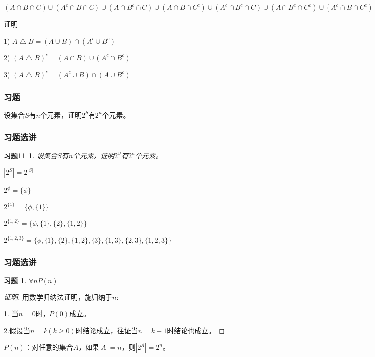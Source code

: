 \documentclass{beamer}
\begin{document}
\begin{CJK*}{UTF8}{gbsn}
\begin{frame}
\begin{Exercise}
$(A \cap B \cap C)\cup (A^c \cap B \cap C) \cup (A \cap B^c \cap C) \cup (A \cap B \cap C^c) \cup (A^c \cap B^c \cap C) \cup (A \cap B^c \cap C^c) \cup (A^c \cap B \cap C^c)$
  \end{Exercise}
  \begin{Exercise}
   证明

1) $A\bigtriangleup B = (A\cup B) \cap (A^c \cup B^c)$

2) $(A \bigtriangleup B)^c = (A \cap B) \cup (A^c \cap B^c)$

3) $(A \bigtriangleup B)^c = (A^c \cup B) \cap (A \cup B^c)$
  \end{Exercise}  
\end{frame}

\begin{frame}
  \frametitle{习题}
  \begin{Exercise}
    设集合$S$有$n$个元素，证明$2^S$有$2^n$个元素。
  \end{Exercise}  
\end{frame}

\newtheorem*{Exercise11}{习题11}
\begin{frame}
  \frametitle{习题选讲}
  \begin{Exercise11}
    设集合$S$有$n$个元素，证明$2^S$有$2^n$个元素。
  \end{Exercise11}

  $|2^S|=2^{|S|}$

  $2^{\phi} = \{\phi\}$

  $2^{\{1\}} = \{\phi, \{1\}\}$

  $2^{\{1,2\}} = \{\phi, \{1\}, \{2\}, \{1,2\}\}$

  $2^{\{1,2,3\}} = \{\phi, \{1\}, \{2\}, \{1,2\}, \{3\}, \{1,3\}, \{2,3\}, \{1,2,3\}\}$
\end{frame}

\begin{frame}
  \frametitle{习题选讲}
   \newtheorem*{Exercise0}{习题}
  \begin{Exercise0}
    $\forall n P(n)$
  \end{Exercise0}

  \begin{proof}[证明]
    用数学归纳法证明，施归纳于$n$:

   1. 当$n=0$时，$P(0)$成立。

   2.假设当$n=k(k\geq 0)$时结论成立，往证当$n=k+1$时结论也成立。
    
 \end{proof}

 $P(n)$：对任意的集合$A$，如果$|A|=n$，则$|2^A|=2^n$。


\end{frame}
\end{CJK*}
\end{document}
